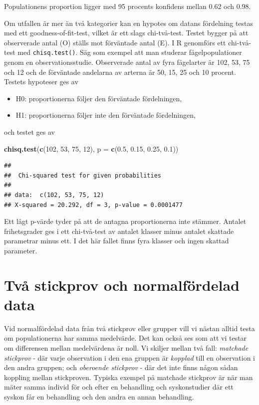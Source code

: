 \documentclass[
]{book}
\newenvironment{Shaded}{\begin{snugshade}}{\end{snugshade}}
\newcommand{\AttributeTok}[1]{\textcolor[rgb]{0.13,0.29,0.53}{#1}}
\newcommand{\DecValTok}[1]{\textcolor[rgb]{0.00,0.00,0.81}{#1}}
\newcommand{\FloatTok}[1]{\textcolor[rgb]{0.00,0.00,0.81}{#1}}
\newcommand{\FunctionTok}[1]{\textcolor[rgb]{0.13,0.29,0.53}{\textbf{#1}}}
\newcommand{\NormalTok}[1]{#1}
\providecommand{\tightlist}{%
  \setlength{\itemsep}{0pt}\setlength{\parskip}{0pt}}
\theoremstyle{definition}
\theoremstyle{definition}
\theoremstyle{definition}
\theoremstyle{definition}
\theoremstyle{remark}
\begin{document}
Populationens proportion ligger med 95 procents konfidens mellan 0.62 och 0.98.

Om utfallen är mer än två kategorier kan en hypotes om datans fördelning testas med ett goodness-of-fit-test, vilket är ett slags chi-två-test. Testet bygger på att observerade antal (O) ställs mot förväntade antal (E). I R genomförs ett chi-två-test med \texttt{chisq.test()}. Säg som exempel att man studerar fågelpopulationer genom en observationsstudie. Observerade antal av fyra fågelarter är 102, 53, 75 och 12 och de förväntade andelarna av arterna är 50, 15, 25 och 10 procent. Testets hypoteser ges av

\begin{itemize}
\tightlist
\item
  H0: proportionerna följer den förväntade fördelningen,
\item
  H1: proportionerna följer inte den förväntade fördelningen,
\end{itemize}

och testet ges av

\begin{Shaded}
\begin{Highlighting}[]
\FunctionTok{chisq.test}\NormalTok{(}\FunctionTok{c}\NormalTok{(}\DecValTok{102}\NormalTok{, }\DecValTok{53}\NormalTok{, }\DecValTok{75}\NormalTok{, }\DecValTok{12}\NormalTok{), }\AttributeTok{p =} \FunctionTok{c}\NormalTok{(}\FloatTok{0.5}\NormalTok{, }\FloatTok{0.15}\NormalTok{, }\FloatTok{0.25}\NormalTok{, }\FloatTok{0.1}\NormalTok{))}
\end{Highlighting}
\end{Shaded}

\begin{verbatim}
## 
##  Chi-squared test for given probabilities
## 
## data:  c(102, 53, 75, 12)
## X-squared = 20.292, df = 3, p-value = 0.0001477
\end{verbatim}

Ett lågt p-värde tyder på att de antagna proportionerna inte stämmer. Antalet frihetsgrader ges i ett chi-två-test av antalet klasser minus antalet skattade parametrar minus ett. I det här fallet finns fyra klasser och ingen skattad parameter.

\section{Två stickprov och normalfördelad data}\label{tvuxe5-stickprov-och-normalfuxf6rdelad-data}

Vid normalfördelad data från två stickprov eller grupper vill vi nästan alltid testa om populationerna har samma medelvärde. Det kan också ses som att vi testar om differensen mellan medelvärdena är noll. Vi skiljer mellan två fall: \emph{matchade stickprov} - där varje observation i den ena gruppen är \emph{kopplad} till en observation i den andra gruppen; och \emph{oberoende stickprov} - där det inte finns någon sådan koppling mellan stickproven. Typiska exempel på matchade stickprov är när man mäter samma individ för och efter en behandling och syskonstudier där ett syskon får en behandling och den andra en annan behandling.
\end{document}
